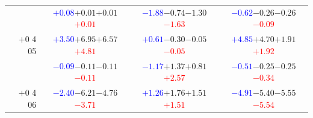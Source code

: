 \documentclass[compress]{beamer}
\begin{document}
\begin{frame}
\begin{tabular}{r | c | c | c}
          & \textcolor{blue}{$+0.08$}\hspace{0.1 cm}$+0.01$\hspace{0.1 cm}$+0.01$\hspace{0.1 cm}\textcolor{red}{$+0.01$} & \textcolor{blue}{$-1.88$}\hspace{0.1 cm}$-0.74$\hspace{0.1 cm}$-1.30$\hspace{0.1 cm}\textcolor{red}{$-1.63$} & \textcolor{blue}{$-0.62$}\hspace{0.1 cm}$-0.26$\hspace{0.1 cm}$-0.26$\hspace{0.1 cm}\textcolor{red}{$-0.09$} \\
$+$0 4 05 & \textcolor{blue}{$+3.50$}\hspace{0.1 cm}$+6.95$\hspace{0.1 cm}$+6.57$\hspace{0.1 cm}\textcolor{red}{$+4.81$} & \textcolor{blue}{$+0.61$}\hspace{0.1 cm}$-0.30$\hspace{0.1 cm}$-0.05$\hspace{0.1 cm}\textcolor{red}{$-0.05$} & \textcolor{blue}{$+4.85$}\hspace{0.1 cm}$+4.70$\hspace{0.1 cm}$+1.91$\hspace{0.1 cm}\textcolor{red}{$+1.92$} \\
          & \textcolor{blue}{$-0.09$}\hspace{0.1 cm}$-0.11$\hspace{0.1 cm}$-0.11$\hspace{0.1 cm}\textcolor{red}{$-0.11$} & \textcolor{blue}{$-1.17$}\hspace{0.1 cm}$+1.37$\hspace{0.1 cm}$+0.81$\hspace{0.1 cm}\textcolor{red}{$+2.57$} & \textcolor{blue}{$-0.51$}\hspace{0.1 cm}$-0.25$\hspace{0.1 cm}$-0.25$\hspace{0.1 cm}\textcolor{red}{$-0.34$} \\
$+$0 4 06 & \textcolor{blue}{$-2.40$}\hspace{0.1 cm}$-6.21$\hspace{0.1 cm}$-4.76$\hspace{0.1 cm}\textcolor{red}{$-3.71$} & \textcolor{blue}{$+1.26$}\hspace{0.1 cm}$+1.76$\hspace{0.1 cm}$+1.51$\hspace{0.1 cm}\textcolor{red}{$+1.51$} & \textcolor{blue}{$-4.91$}\hspace{0.1 cm}$-5.40$\hspace{0.1 cm}$-5.55$\hspace{0.1 cm}\textcolor{red}{$-5.54$} \\

\end{tabular}
\end{frame}
\end{document}
